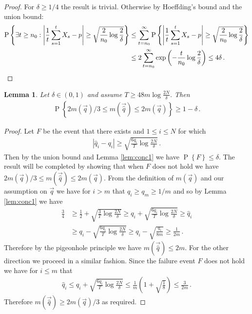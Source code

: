 \documentclass{article}
\newcommand{\eq}[1]{\begin{align*}#1\end{align*}}
\renewcommand{\P}[1]{\operatorname{P}\left\{#1\right\}}
\theoremstyle{plain}
\newtheorem{lemma}[theorem]{Lemma}
\theoremstyle{definition}
\begin{document}
\begin{proof}
For $\delta \geq 1/4$ the result is trivial. Otherwise 
by Hoeffding's bound and the union bound:
\eq{
\P{\exists t \geq n_0 : \left|\frac{1}{t} \sum_{s=1}^t X_s - p\right| \geq \sqrt{\frac{2}{n_0} \log \frac{2}{\delta}}} 
&\leq \sum_{t = n_0}^\infty \P{\left|\frac{1}{t} \sum_{s=1}^t X_s - p\right| \geq \sqrt{\frac{2}{n_0} \log \frac{2}{\delta}}} \\
&\leq 2\sum_{t=n_0}^\infty \exp\left(-\frac{t}{n_0} \log \frac{2}{\delta}\right) 
\leq 4\delta\,. \qedhere
}
\end{proof}



\begin{lemma}\label{lem:m_est}
Let $\delta \in (0,1)$ and assume $T \geq 48m \log\frac{2N}{\delta}$. Then
\eq{
\P{2m(\vec{q}) / 3 \leq m(\vec{\hat q}) \leq 2m(\vec{q})} \geq 1 - \delta\,.
}
\end{lemma}

\begin{proof}
Let $F$ be the event that there exists and $1 \leq i \leq N$ for which
\eq{
\left|\hat q_i - q_i\right| \geq \sqrt{\frac{6q_i}{T} \log \frac{2N}{\delta}}\,.
}
Then by the union bound and Lemma \ref{lem:conc1} we have $\P{F} \leq \delta$. The result will be completed by showing that
when $F$ does not hold we have $2m(\vec{q})/3 \leq m(\vec{\hat q}) \leq 2m(\vec{q})$.
From the definition of $m(\vec{q})$ and our assumption on $\vec{q}$ we have for $i > m$ that $q_i \geq q_m \geq 1/m$ and so by Lemma \ref{lem:conc1} we have
\eq{
\frac{3}{4} 
&\geq \frac{1}{2} + \sqrt{\frac{3}{T} \log \frac{2N}{\delta}} 
\geq q_i + \sqrt{\frac{6q_i}{T} \log \frac{2N}{\delta}} 
\geq \hat q_i \\
&\geq q_i - \sqrt{\frac{6q_i}{T} \log \frac{2N}{\delta}}
\geq q_i - \sqrt{\frac{q_i}{8m}}
\geq \frac{1}{2m}\,.
}
Therefore by the pigeonhole principle we have $m(\vec{\hat q}) \leq 2m$.
For the other direction we proceed in a similar fashion. Since the failure event $F$ does not hold we have for $i \leq m$ that
\eq{
\hat q_i 
\leq q_i + \sqrt{\frac{6q_i}{T} \log\frac{2N}{\delta}} 
\leq \frac{1}{m} \left(1 + \sqrt{\frac{1}{8}}\right)
\leq \frac{3}{2m}\,.
}
Therefore $m(\vec{\hat q}) \geq 2m(\vec{q}) / 3$ as required. 
\end{proof}
\end{document}
